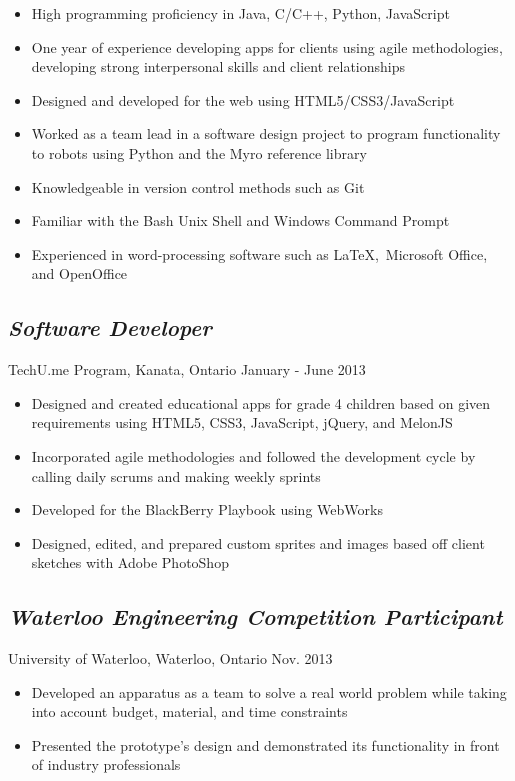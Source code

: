 \documentclass[12pt]{article}
\begin{document}
\begin{minipage}[t]{0.8\linewidth} 
	\begin{itemize}
		\item High programming proficiency in Java, C/C++, Python, JavaScript
		\item One year of experience developing apps for clients using agile methodologies, developing strong 						interpersonal skills and client relationships
		\item Designed and developed for the web using HTML5/CSS3/JavaScript
		\item Worked as a team lead in a software design project to program functionality to robots using Python
				and the Myro reference library
		\item Knowledgeable in version control methods such as Git
		\item Familiar with the Bash Unix Shell and Windows Command Prompt
		\item Experienced in word-processing software such as \LaTeX,\ Microsoft Office, and OpenOffice
	\end{itemize}

	\subsection*{\textit{Software Developer}} \vspace{-6pt} 
		TechU.me Program, Kanata, Ontario \hspace{45pt} January - June 2013
		\begin{itemize}
			\item Designed and created educational apps for grade 4 children based on given requirements using 			 				HTML5, CSS3, JavaScript, jQuery, and MelonJS
			\item Incorporated agile methodologies and followed the development cycle by calling daily scrums and 						making weekly sprints
			\item Developed for the BlackBerry Playbook using WebWorks
			\item Designed, edited, and prepared custom sprites and images based off client sketches with Adobe 							PhotoShop
		\end{itemize}
		
	\subsection*{\textit{Waterloo Engineering Competition Participant}} \vspace{-6pt} 
		University of Waterloo, Waterloo, Ontario \hspace{70pt} Nov. 2013
		\begin{itemize}
			\item Developed an apparatus as a team to solve a real world problem while taking into account budget, 				material, and time constraints
			\item Presented the prototype's design and demonstrated its functionality in front of industry 								professionals
		\end{itemize}	
	

\end{minipage}
\end{document}
